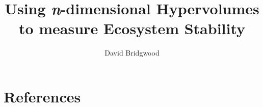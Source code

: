 \documentclass[a4paper,12pt,oneside]{article}
\begin{document}
\title{Using \emph{n}-dimensional Hypervolumes to measure Ecosystem Stability}

\author{David Bridgwood}

\maketitle

\preface




\body
\normalsize

\clearpage






\clearpage
\onehalfspacing
\section{References}
{\def\section*#1{}
	
}


\clearpage

\end{document}
